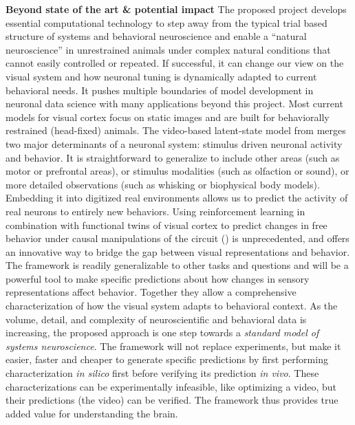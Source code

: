 \documentclass[COG,11pt]{ercgrant}
\begin{document}
\textbf{Beyond state of the art \& potential impact} 
The proposed project develops essential computational technology to step away from the typical trial based structure of systems and behavioral neuroscience and enable a ``natural neuroscience'' in unrestrained animals under complex natural conditions that cannot easily controlled or repeated. 
If successful, it can change our view on the visual system and how neuronal tuning is dynamically adapted to current behavioral needs. 
It pushes multiple boundaries of model development in neuronal data science with many applications beyond this project.  Most current models for visual cortex focus on static images and are built for behaviorally restrained (head-fixed) animals. The video-based latent-state model from  merges two major determinants of a neuronal system: stimulus driven neuronal activity and behavior. It is straightforward to generalize to include other areas (such as motor or prefrontal areas), or stimulus modalities (such as olfaction or sound), or more detailed observations (such as whisking or biophysical body models). 
Embedding it into digitized real environments allows us to predict the activity of real neurons to entirely new behaviors. 
 Using reinforcement learning in combination with functional twins of visual cortex to predict changes in free behavior under causal manipulations of the circuit () is unprecedented, and offers an innovative way to bridge the gap between visual representations and behavior. 
The framework is readily generalizable to other tasks and questions and will be a powerful tool to make specific predictions about how changes in sensory representations affect behavior.
 Together they allow a comprehensive characterization of how the visual system adapts to behavioral context. 
As the volume, detail, and complexity of neuroscientific and behavioral data is increasing, the proposed approach is one step towards a \textit{standard model of systems neuroscience}.
The framework will not replace experiments, but make it easier, faster and cheaper to generate specific predictions by first performing characterization \textit{in silico} first before verifying its prediction \textit{in vivo}.
These characterizations can be experimentally infeasible, like optimizing a video, but their predictions (the video) can be verified.
The framework thus provides true added value for understanding the brain.
\end{document}
